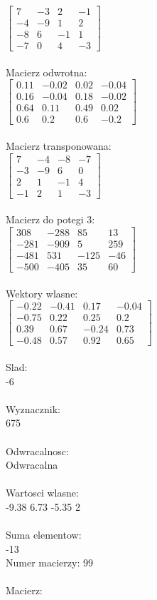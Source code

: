 \documentclass[a4paper,12pt]{article}
\begin{document}
$\begin{bmatrix} 7&-3&2&-1\\-4&-9&1&2\\-8&6&-1&1\\-7&0&4&-3 \end{bmatrix}$
\\
\\
Macierz odwrotna:\\

$\begin{bmatrix} 0.11&-0.02&0.02&-0.04\\0.16&-0.04&0.18&-0.02\\0.64&0.11&0.49&0.02\\0.6&0.2&0.6&-0.2 \end{bmatrix}$
\\
\\
Macierz transponowana:\\

$\begin{bmatrix} 7&-4&-8&-7\\-3&-9&6&0\\2&1&-1&4\\-1&2&1&-3 \end{bmatrix}$
\\
\\
Macierz do potegi 3:\\

$\begin{bmatrix} 308&-288&85&13\\-281&-909&5&259\\-481&531&-125&-46\\-500&-405&35&60 \end{bmatrix}$
\\
\\
Wektory wlasne:\\

$\begin{bmatrix} -0.22&-0.41&0.17&-0.04\\-0.75&0.22&0.25&0.2\\0.39&0.67&-0.24&0.73\\-0.48&0.57&0.92&0.65 \end{bmatrix}$
\\
\\
Slad:\\
-6
\\
\\
Wyznacznik:\\
675
\\
\\
Odwracalnosc:\\
Odwracalna
\\
\\
Wartosci wlasne:\\
-9.38 6.73 -5.35 2
\\
\\
Suma elementow:\\
-13
\\
\newpage
Numer macierzy:
99
\\
\\
Macierz:\\
\end{document}
